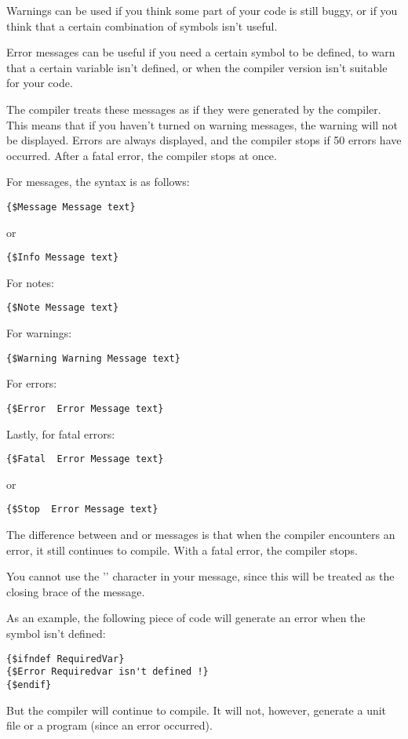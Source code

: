 Warnings can be used if you think some part of your code is still buggy, or
if you think that a certain combination of symbols isn't useful.

Error messages can be useful if you need a certain symbol to be defined,
to warn that a certain variable isn't defined, or when the compiler
version isn't suitable for your code.

The compiler treats these messages as if they were generated by the
compiler. This means that if you haven't turned on warning messages, the
warning will not be displayed. Errors are always displayed, and the
compiler stops if 50 errors have occurred. After a fatal error, the compiler
stops at once.

For messages, the syntax is as follows:
\begin{verbatim}
{$Message Message text}
\end{verbatim}
or
\begin{verbatim}
{$Info Message text}
\end{verbatim}
For notes:
\begin{verbatim}
{$Note Message text}
\end{verbatim}
For warnings:
\begin{verbatim}
{$Warning Warning Message text}
\end{verbatim}
For errors:
\begin{verbatim}
{$Error  Error Message text}
\end{verbatim}
Lastly, for fatal errors:
\begin{verbatim}
{$Fatal  Error Message text}
\end{verbatim}
or
\begin{verbatim}
{$Stop  Error Message text}
\end{verbatim}
The difference between  and  or 
messages is that when the compiler encounters an error, it still continues
to compile. With a fatal error, the compiler stops.

\begin{remark}You cannot use the '\var{\}}' character in your message, since
this will be treated as the closing brace of the message.
\end{remark}
As an example, the following piece of code will generate an error when
the symbol  isn't defined:
\begin{verbatim}
{$ifndef RequiredVar}
{$Error Requiredvar isn't defined !}
{$endif}
\end{verbatim}
But the compiler will continue to compile. It will not, however, generate a
unit file or a program (since an error occurred).


